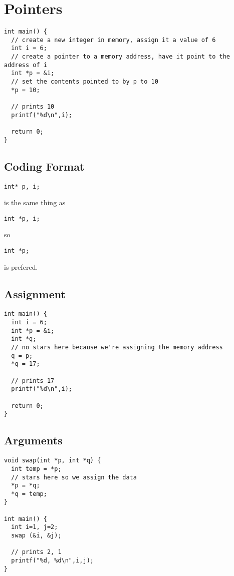 \documentclass[12pt]{article}
\begin{document}
\section*{Pointers}
\begin{verbatim}
int main() {
  // create a new integer in memory, assign it a value of 6
  int i = 6;
  // create a pointer to a memory address, have it point to the address of i
  int *p = &i;
  // set the contents pointed to by p to 10
  *p = 10;

  // prints 10
  printf("%d\n",i);

  return 0;
}
\end{verbatim}

\subsection*{Coding Format}
\begin{verbatim}int* p, i;\end{verbatim} is the same thing as \begin{verbatim}int *p, i;\end{verbatim} so \begin{verbatim}int *p;\end{verbatim} is prefered.

\subsection*{Assignment}
\begin{verbatim}
int main() {
  int i = 6;
  int *p = &i;
  int *q;
  // no stars here because we're assigning the memory address
  q = p;
  *q = 17;

  // prints 17
  printf("%d\n",i);

  return 0;
}
\end{verbatim}

\subsection*{Arguments}
\begin{verbatim}
void swap(int *p, int *q) {
  int temp = *p;
  // stars here so we assign the data
  *p = *q;
  *q = temp;
}

int main() {
  int i=1, j=2;
  swap (&i, &j);

  // prints 2, 1
  printf("%d, %d\n",i,j);
}
\end{verbatim}
\end{document}
